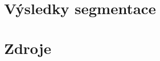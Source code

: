 \documentclass[11pt]{beamer}
\begin{document}
\section{Výsledky segmentace}
\begin{frame}

\end{frame}

\section*{Zdroje}
\begin{frame}

\end{frame}
\end{document}
